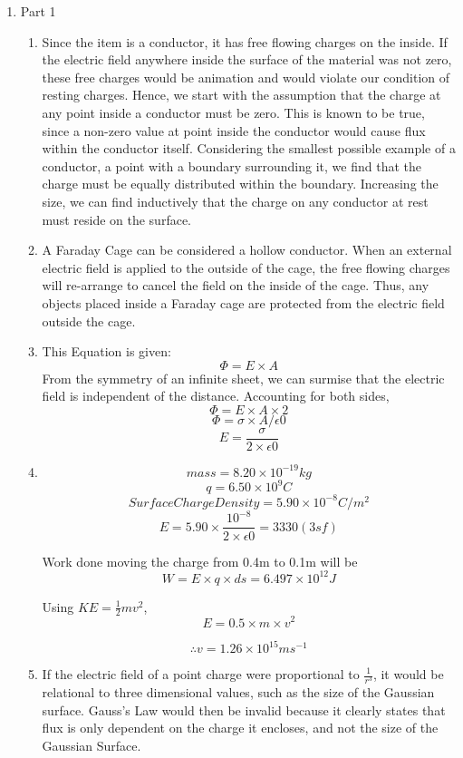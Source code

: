 \documentclass{article}
\begin{document}
\begin{enumerate}
\item Part 1
\begin{enumerate}[label*=\arabic*.]
 \item Since the item is a conductor, it has free flowing charges on the inside. If the electric field anywhere inside the surface of the material was not zero, these free charges would be animation and would violate our condition of resting charges.
 	Hence, we start with the assumption that the charge at any point inside a conductor must be zero. This is known to be true, since a non-zero value at point inside the conductor would cause flux within the conductor itself. Considering the smallest possible example of a conductor, a point with a boundary surrounding it, we find that the charge must be equally distributed within the boundary. Increasing the size, we can find inductively that the charge on any conductor at rest must reside on the surface.
 \item 
 	  A Faraday Cage can be considered a hollow conductor. When an external electric field is applied to the outside of the cage, the free flowing charges will re-arrange to cancel the field on the inside of the cage. Thus, any objects placed inside a Faraday cage are protected from the electric field outside the cage.
	  
 \item This Equation is given:
 \[ \Phi = E \times A \]
 From the symmetry of an infinite sheet, we can surmise that the electric field is independent of the distance.
 Accounting for both sides,
 \[ \Phi = E \times A \times 2 \]
 \[ \Phi = \sigma \times A / \epsilon 0 \]
\[ E = \frac{\sigma}{2 \times \epsilon 0} \]

\item 
	\[ mass = 8.20 \times 10^{-19} kg \]
	\[ q = 6.50 \times 10^9 C \]
	\[Surface Charge Density = 5.90 \times 10^{-8} C/m^2 \]
	\[ E = 5.90 \times \frac{10^{-8}}{2 \times \epsilon 0} = 3330 (3sf) \]
	
	Work done moving the charge from 0.4m to 0.1m will be 
	\[ W = E \times q \times ds = 6.497 \times 10^12 J \]
	
	Using $KE = \frac{1}{2}mv^2$, 
	\[ E = 0.5 \times m \times v^2 \]
	
	\[ \therefore v = 1.26 \times 10^{15} ms^{-1} \]
	
\item If the electric field of a point charge were proportional to $\frac{1}{r^3}$, it would be relational to three dimensional values, such as the size of the Gaussian surface. Gauss's Law would then be invalid because it clearly states that flux is only dependent on the charge it encloses, and not the size of the Gaussian Surface.


\end{enumerate}
\end{enumerate}
\end{document}
